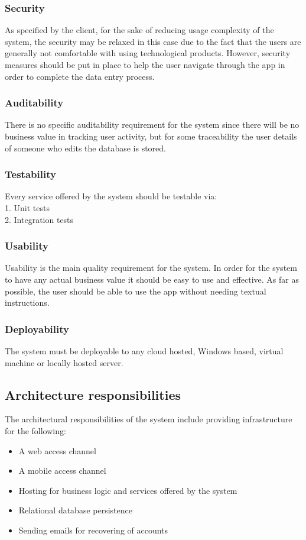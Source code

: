 \documentclass[11pt,a4paper,titlepage]{article}
\begin{document}
		\subsubsection{Security}
			As specified by the client, for the sake of reducing usage complexity of the system, the security may be relaxed in this case due to the fact that the users are generally not comfortable with using technological products. However, security measures should be put in place to help the user navigate through the app in order to complete the data entry process.
		\subsubsection{Auditability}
			There is no specific auditability requirement for the system since there will be no business value in tracking user activity, but for some traceability the user details of someone who edits the database is stored.
		\subsubsection{Testability}
			Every service offered by the system should be testable via:\\
			1. Unit tests\\
			2. Integration tests
		\subsubsection{Usability}
			Usability is the main quality requirement for the system. In order for the system to have any actual business value it should be easy to use and effective. As far as possible, the user should be able to use the app without needing textual instructions.
		\subsubsection{Deployability}
			The system must be deployable to any cloud hosted, Windows based, virtual machine or locally hosted server.
	\subsection{Architecture responsibilities}
	The architectural responsibilities of the system include providing infrastructure for the following:
		\begin{itemize}
			\item A web access channel
			\item A mobile access channel
			\item Hosting for business logic and services offered by the system
			\item Relational database persistence
			\item Sending emails for recovering of accounts
		\end{itemize}
\end{document}
